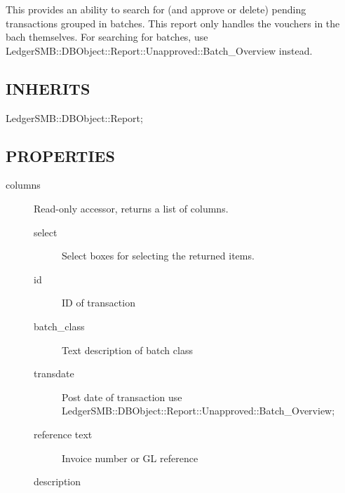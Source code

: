 \begin{description}
\begin{description}
\begin{description}
\begin{description}
\begin{description}
\begin{description}
\begin{description}
\begin{description}
\begin{description}
\begin{description}
This provides an ability to search for (and approve or delete) pending
transactions grouped in batches.  This report only handles the vouchers in the 
bach themselves. For searching for batches, use
LedgerSMB::DBObject::Report::Unapproved::Batch\_Overview instead.

\subsection*{INHERITS\label{LedgerSMB::DBObject::Report::Unapproved::Batch_Detail_INHERITS}}
\begin{description}

\item[{LedgerSMB::DBObject::Report;}] \mbox{}\end{description}
\subsection*{PROPERTIES\label{LedgerSMB::DBObject::Report::Unapproved::Batch_Detail_PROPERTIES}}
\begin{description}

\item[{columns}] \mbox{}

Read-only accessor, returns a list of columns.

\begin{description}

\item[{select}] \mbox{}

Select boxes for selecting the returned items.


\item[{id}] \mbox{}

ID of transaction


\item[{batch\_class}] \mbox{}

Text description of batch class


\item[{transdate}] \mbox{}

Post date of transaction
use LedgerSMB::DBObject::Report::Unapproved::Batch\_Overview;


\item[{reference text}] \mbox{}

Invoice number or GL reference


\item[{description}] \mbox{}


\end{description}
\end{description}
\end{description}
\end{description}
\end{description}
\end{description}
\end{description}
\end{description}
\end{description}
\end{description}
\end{description}
\end{description}
